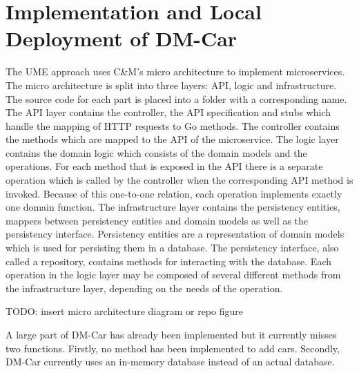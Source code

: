 



\section{Implementation and Local Deployment of DM-Car}

The UME approach uses C\&M's micro architecture to implement microservices.
The micro architecture is split into three layers: API, logic and infrastructure.
The source code for each part is placed into a folder with a corresponding name.
The API layer contains the controller, the API specification and stubs which handle the mapping
of HTTP requests to Go methods.
The controller contains the methods which are mapped to the API of the microservice.
The logic layer contains the domain logic which consists of the domain models and the operations.
For each method that is exposed in the API there is a separate operation which is called by the controller
when the corresponding API method is invoked. Because of this one-to-one relation, each operation
implements exactly one domain function.
The infrastructure layer contains the persistency entities, mappers between persistency entities and domain models
as well as the persistency interface.
Persistency entities are a representation of domain models which is used for persisting them in a database.
The persistency interface, also called a repository, contains methods for interacting with the database.
Each operation in the logic layer may be composed of several different methods from the infrastructure layer,
depending on the needs of the operation.

TODO: insert micro architecture diagram or repo figure

A large part of DM-Car has already been implemented but it currently misses two functions.
Firstly, no method has been implemented to add cars.
Secondly, DM-Car currently uses an in-memory database instead of an actual database.

